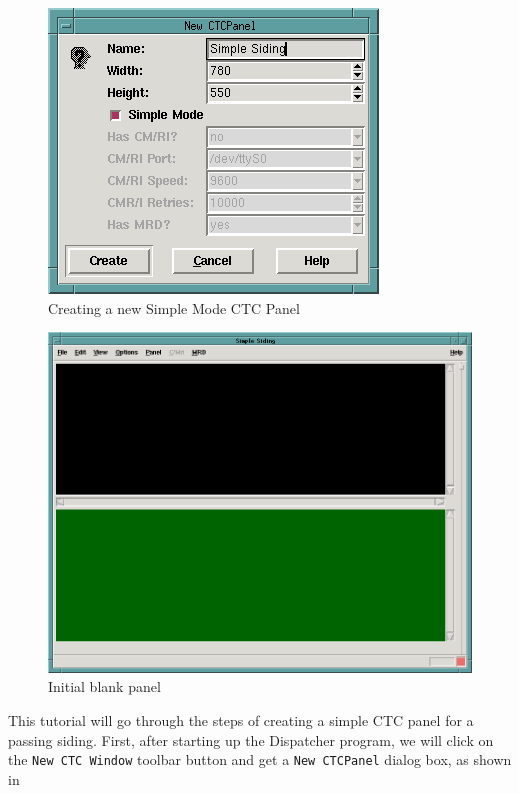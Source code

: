 \begin{figure}[hbpt]
\begin{centering}
\includegraphics{DISPSimpleTutNewCTC.png}
\caption{Creating a new Simple Mode CTC Panel}
\label{fig:dispatcher:Tut:newSimplePanel}
\end{centering}
\end{figure}
\begin{figure}[hbpt]
\begin{centering}
\includegraphics[width=5in]{DISPSimpleTutBlankCTC.png}
\caption{Initial blank panel}
\label{fig:dispatcher:Tut:blankPanel}
\end{centering}
\end{figure}
%
This tutorial will go through the steps of creating a simple CTC panel
for a passing siding.  First, after starting up the Dispatcher program,
we will click on the \texttt{New CTC Window} toolbar button and get a
\texttt{New CTCPanel} dialog box, as shown in

